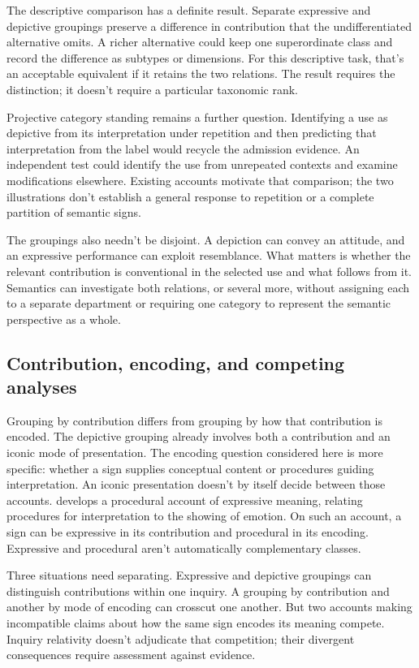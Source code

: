 \documentclass[12pt]{article}
\begin{document}
The descriptive comparison has a definite result. Separate expressive
and depictive groupings preserve a difference in contribution that the
undifferentiated alternative omits. A richer alternative could keep one
superordinate class and record the difference as subtypes or dimensions.
For this descriptive task, that's an acceptable equivalent if it retains
the two relations. The result requires the distinction; it doesn't require
a particular taxonomic rank.

Projective category standing remains a further question. Identifying a use
as depictive from its interpretation under repetition and then predicting
that interpretation from the label would recycle the admission evidence.
An independent test could identify the use from unrepeated contexts and
examine modifications elsewhere. Existing accounts motivate that comparison;
the two illustrations don't establish a general response to repetition or
a complete partition of semantic signs.

The groupings also needn't be disjoint. A depiction can convey an attitude,
and an expressive performance can exploit resemblance. What matters is
whether the relevant contribution is conventional in the selected use and
what follows from it. Semantics can investigate both relations, or several
more, without assigning each to a separate department or requiring one
category to represent the semantic perspective as a whole.

\subsection{Contribution, encoding, and competing analyses}

Grouping by contribution differs from grouping by how that contribution
is encoded. The depictive grouping already involves both a contribution
and an iconic mode of presentation. The encoding question considered
here is more specific: whether a sign supplies conceptual content or
procedures guiding interpretation. An iconic presentation doesn't by
itself decide between those accounts. \textcite{wharton2016expressives} develops a procedural account
of expressive meaning, relating procedures for interpretation to the
showing of emotion. On such an account, a sign can be expressive in its
contribution and procedural in its encoding. Expressive and procedural
aren't automatically complementary classes.

Three situations need separating. Expressive and depictive groupings can
distinguish contributions within one inquiry. A grouping by contribution
and another by mode of encoding can crosscut one another. But two accounts
making incompatible claims about how the same sign encodes its meaning
compete. Inquiry relativity doesn't adjudicate that competition; their divergent consequences require assessment against evidence.
\end{document}
